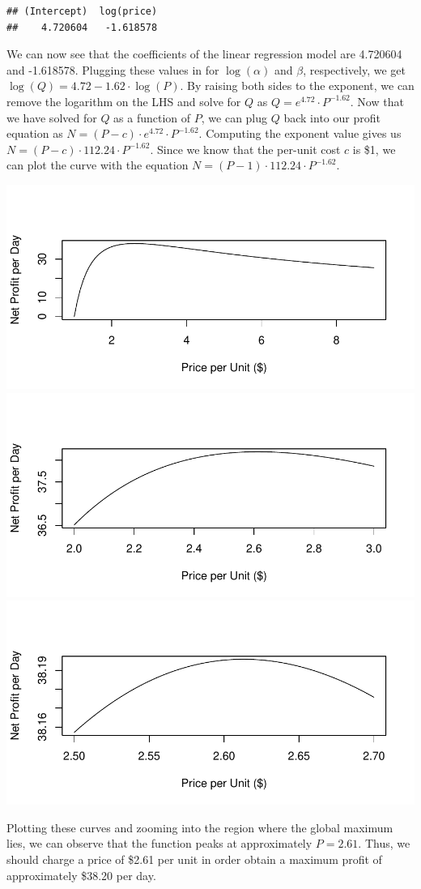 \documentclass[]{article}
\begin{document}
\begin{verbatim}
## (Intercept)  log(price) 
##    4.720604   -1.618578
\end{verbatim}

We can now see that the coefficients of the linear regression model are
4.720604 and -1.618578. Plugging these values in for \(\log (\alpha)\)
and \(\beta\), respectively, we get
\(\log (Q) = 4.72 - 1.62 \cdot \log (P)\). By raising both sides to the
exponent, we can remove the logarithm on the LHS and solve for \(Q\) as
\(Q = e^{4.72} \cdot P^{-1.62}\). Now that we have solved for \(Q\) as a
function of \(P\), we can plug \(Q\) back into our profit equation as
\(N = (P - c) \cdot e^{4.72} \cdot P^{-1.62}\). Computing the exponent
value gives us \(N = (P - c) \cdot 112.24 \cdot P^{-1.62}\). Since we
know that the per-unit cost \(c\) is \$1, we can plot the curve with the
equation \(N = (P - 1) \cdot 112.24 \cdot P^{-1.62}\).

\includegraphics{Report_files/figure-latex/milk5-1.pdf}
\includegraphics{Report_files/figure-latex/milk6-1.pdf}
\includegraphics{Report_files/figure-latex/milk7-1.pdf}

Plotting these curves and zooming into the region where the global
maximum lies, we can observe that the function peaks at approximately
\(P = 2.61\). Thus, we should charge a price of \$2.61 per unit in order
obtain a maximum profit of approximately \$38.20 per day.
\end{document}
